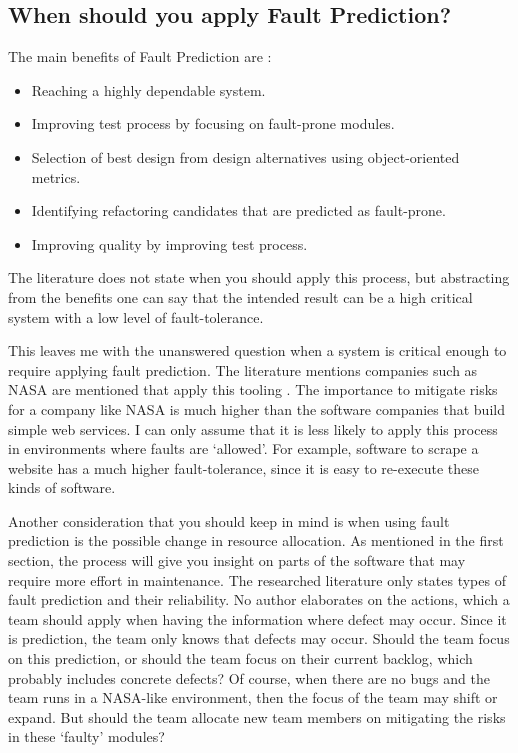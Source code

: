\subsection*{When should you apply Fault Prediction?}

The main benefits of Fault Prediction are \autocite[4626]{Catal20114626}:

\begin{itemize}
\setlength\itemsep{0em}
\item Reaching a highly dependable system.
\item Improving test process by focusing on fault-prone modules.
\item Selection of best design from design alternatives using object-oriented metrics.
\item Identifying refactoring candidates that are predicted as fault-prone.
\item Improving quality by improving test process.
\end{itemize}

The literature does not state when you should apply this process,
but abstracting from the benefits one can say that the intended result can be a high critical system with a low level of fault-tolerance.

This leaves me with the unanswered question when a system is critical enough to require applying fault prediction.
The literature mentions companies such as NASA are mentioned that apply this tooling \autocite[4626]{Catal20114626} \autocite[7347]{Catal20097346}.
The importance to mitigate risks for a company like NASA is much higher than the software companies that build simple web services.
I can only assume that it is less likely to apply this process in environments where faults are `allowed'.
For example, software to scrape a website has a much higher fault-tolerance, since it is easy to re-execute these kinds of software.

Another consideration that you should keep in mind is when using fault prediction is the possible change in resource allocation.
As mentioned in the first section, the process will give you insight on parts of the software that may require more effort in maintenance.
The researched literature only states types of fault prediction and their reliability.
No author elaborates on the actions, which a team should apply when having the information where defect may occur.
Since it is prediction, the team only knows that defects may occur.
Should the team focus on this prediction, or should the team focus on their current backlog, which probably includes concrete defects?
Of course, when there are no bugs and the team runs in a NASA-like environment, then the focus of the team may shift or expand.
But should the team allocate new team members on mitigating the risks in these `faulty' modules?

